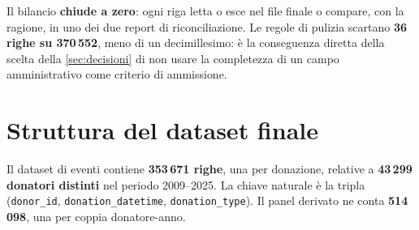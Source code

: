 Il bilancio \textbf{chiude a zero}: ogni riga letta o esce nel file finale o
compare, con la ragione, in uno dei due report di riconciliazione. Le regole di
pulizia scartano \textbf{36 righe su 370\,552}, meno di un decimillesimo: è la
conseguenza diretta della scelta della \cref{sec:decisioni} di non usare la
completezza di un campo amministrativo come criterio di ammissione.

\section{Struttura del dataset finale}
\label{sec:dataset}

Il dataset di eventi contiene \textbf{353\,671 righe}, una per donazione,
relative a \textbf{43\,299 donatori distinti} nel periodo 2009--2025. La chiave
naturale è la tripla (\texttt{donor\_id}, \texttt{donation\_datetime},
\texttt{donation\_type}). Il panel derivato ne conta \textbf{514\,098}, una per
coppia donatore-anno.


